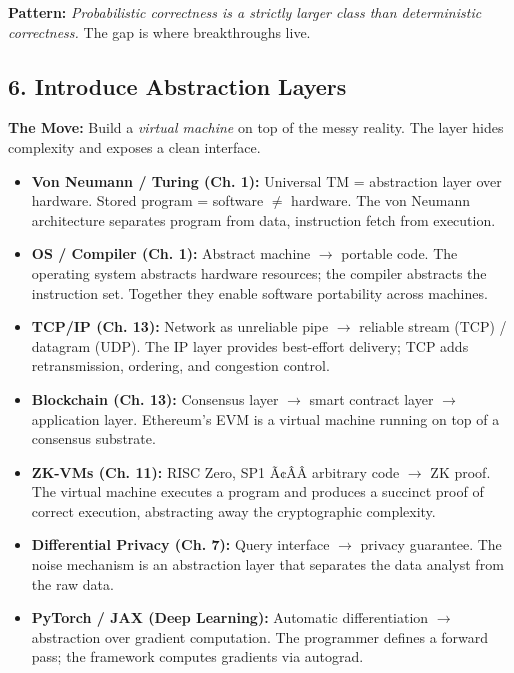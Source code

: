 \begin{mentalLeap}\textbf{Pattern:} \emph{Probabilistic correctness is a strictly larger class than deterministic correctness.} The gap is where breakthroughs live.\end{mentalLeap}
\subsection{6. Introduce Abstraction Layers}
\label{sec:anatomy:abstraction}

\textbf{The Move:} Build a \emph{virtual machine} on top of the messy reality. The layer hides complexity and exposes a clean interface.

\begin{itemize}
\item \textbf{Von Neumann / Turing (Ch. 1):} Universal TM = abstraction layer over hardware. Stored program = software $\neq$ hardware. The von Neumann architecture separates program from data, instruction fetch from execution.

\item \textbf{OS / Compiler (Ch. 1):} Abstract machine $\to$ portable code. The operating system abstracts hardware resources; the compiler abstracts the instruction set. Together they enable software portability across machines.

\item \textbf{TCP/IP (Ch. 13):} Network as unreliable pipe $\to$ reliable stream (TCP) / datagram (UDP). The IP layer provides best-effort delivery; TCP adds retransmission, ordering, and congestion control.

\item \textbf{Blockchain (Ch. 13):} Consensus layer $\to$ smart contract layer $\to$ application layer. Ethereum's EVM is a virtual machine running on top of a consensus substrate.

\item \textbf{ZK-VMs (Ch. 11):} RISC Zero, SP1 Ã¢ÂÂ arbitrary code $\to$ ZK proof. The virtual machine executes a program and produces a succinct proof of correct execution, abstracting away the cryptographic complexity.

\item \textbf{Differential Privacy (Ch. 7):} Query interface $\to$ privacy guarantee. The noise mechanism is an abstraction layer that separates the data analyst from the raw data.

\item \textbf{PyTorch / JAX (Deep Learning):} Automatic differentiation $\to$ abstraction over gradient computation. The programmer defines a forward pass; the framework computes gradients via autograd.


\end{itemize}
